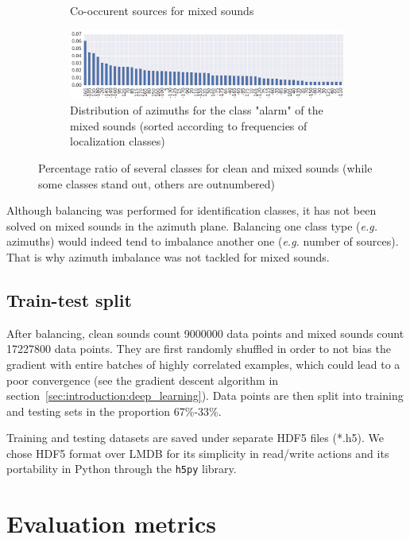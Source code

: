 \begin{figure}[htb]
\begin{subfigure}[t]{0.5\textwidth}
	\caption{Co-occurent sources for mixed sounds}
	\label{fig:methods:class_count_sources}
\end{subfigure}
\begin{subfigure}[t]{\textwidth}
	\centering
	\includegraphics[scale=0.45]{images-data/class_count_azimuths}
	\caption{Distribution of azimuths for the class "alarm" of the mixed sounds (sorted according to frequencies of localization classes)}
	\label{fig:methods:class_count_azimuths}
\end{subfigure}
\label{fig:methods:balancing}
\caption{Percentage ratio of several classes for clean and mixed sounds (while some classes stand out, others are outnumbered)}
\end{figure}

Although balancing was performed for identification classes, it has not been solved on mixed sounds in the azimuth plane. Balancing one class type (\textit{e.g.} azimuths) would indeed tend to imbalance another one (\textit{e.g.} number of sources). That is why azimuth imbalance was not tackled for mixed sounds.

\subsection{Train-test split}

After balancing, clean sounds count \num[group-separator={,}]{9000000} data points and mixed sounds count \num[group-separator={,}]{17227800} data points. They are first randomly shuffled in order to not bias the gradient with entire batches of highly correlated examples, which could lead to a poor convergence (see the gradient descent algorithm in section~\ref{sec:introduction:deep_learning}). Data points are then split into training and testing sets in the proportion 67\%-33\%.

Training and testing datasets are saved under separate HDF5 files (*.h5). We chose HDF5 format over LMDB for its simplicity in read/write actions and its portability in Python through the \verb+h5py+ library.


\section{Evaluation metrics}
\label{sec:methods:metrics}

